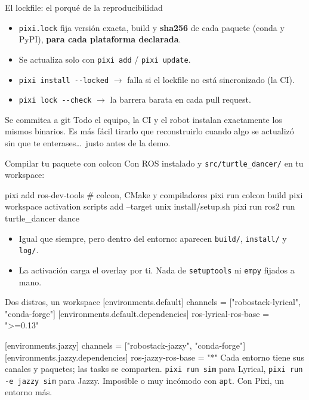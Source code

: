 \documentclass[aspectratio=169]{beamer}
\begin{document}
\begin{frame}{El lockfile: el porqué de la reproducibilidad}
\begin{itemize}
    \item \lstinline|pixi.lock| fija versión exacta, build y \textbf{sha256} de cada paquete (conda y PyPI), \textbf{para cada plataforma declarada}.
    \item Se actualiza solo con \lstinline|pixi add| / \lstinline|pixi update|.
    \item \lstinline|pixi install --locked| $\rightarrow$ falla si el lockfile no está sincronizado (la CI).
    \item \lstinline|pixi lock --check| $\rightarrow$ la barrera barata en cada pull request.
\end{itemize}
\vfill
\begin{block}{Se commitea a git}
Todo el equipo, la CI y el robot instalan exactamente los mismos binarios. Es más fácil tirarlo que reconstruirlo cuando algo se actualizó sin que te enterases\ldots\ justo antes de la demo.
\end{block}
\end{frame}

\begin{frame}[fragile]{Compilar tu paquete con colcon}
Con ROS instalado y \lstinline|src/turtle_dancer/| en tu workspace:
\begin{terminal}
pixi add ros-dev-tools        # colcon, CMake y compiladores
pixi run colcon build
pixi workspace activation scripts add --target unix install/setup.sh
pixi run ros2 run turtle_dancer dance
\end{terminal}
\vfill
\begin{itemize}
    \item Igual que siempre, pero dentro del entorno: aparecen \lstinline|build/|, \lstinline|install/| y \lstinline|log/|.
    \item La activación carga el overlay por ti. Nada de \texttt{setuptools} ni \texttt{empy} fijados a mano.
\end{itemize}
\end{frame}

\begin{frame}[fragile]{Dos distros, un workspace}
[environments.default]
channels = ["robostack-lyrical", "conda-forge"]
[environments.default.dependencies]
ros-lyrical-ros-base = ">=0.13"

[environments.jazzy]
channels = ["robostack-jazzy", "conda-forge"]
[environments.jazzy.dependencies]
ros-jazzy-ros-base = "*"
\vfill
Cada entorno tiene sus canales y paquetes; las tasks se comparten.
\lstinline|pixi run sim| para Lyrical, \lstinline|pixi run -e jazzy sim| para Jazzy.
\vfill
\small Imposible o muy incómodo con \texttt{apt}. Con Pixi, un entorno más.
\end{frame}
\end{document}
